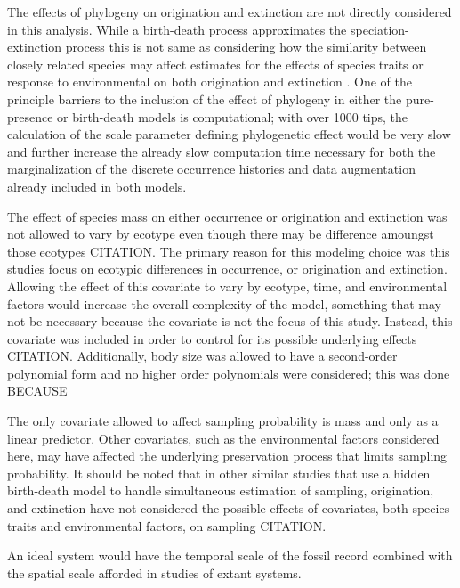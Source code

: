\documentclass[12pt,letterpaper]{article}
\begin{document}
The effects of phylogeny on origination and extinction are not directly considered in this analysis. While a birth-death process approximates the speciation-extinction process \citep{Silvestro2014a} this is not same as considering how the similarity between closely related species may affect estimates for the effects of species traits or response to environmental on both origination and extinction \citep{Smits2015b,Harnik2014}. One of the principle barriers to the inclusion of the effect of phylogeny in either the pure-presence or birth-death models is computational; with over 1000 tips, the calculation of the scale parameter defining phylogenetic effect would be very slow and further increase the already slow computation time necessary for both the marginalization of the discrete occurrence histories and data augmentation already included in both models.

The effect of species mass on either occurrence or origination and extinction was not allowed to vary by ecotype even though there may be difference amoungst those ecotypes CITATION. The primary reason for this modeling choice was this studies focus on ecotypic differences in occurrence, or origination and extinction. Allowing the effect of this covariate to vary by ecotype, time, and environmental factors would increase the overall complexity of the model, something that may not be necessary because the covariate is not the focus of this study. Instead, this covariate was included in order to control for its possible underlying effects CITATION. Additionally, body size was allowed to have a second-order polynomial form and no higher order polynomials were considered; this was done \uppercase{because}

The only covariate allowed to affect sampling probability is mass and only as a linear predictor. Other covariates, such as the environmental factors considered here, may have affected the underlying preservation process that limits sampling probability. It should be noted that in other similar studies that use a hidden birth-death model to handle simultaneous estimation of sampling, origination, and extinction have not considered the possible effects of covariates, both species traits and environmental factors, on sampling CITATION.


An ideal system would have the temporal scale of the fossil record combined with the spatial scale afforded in studies of extant systems.
\end{document}
